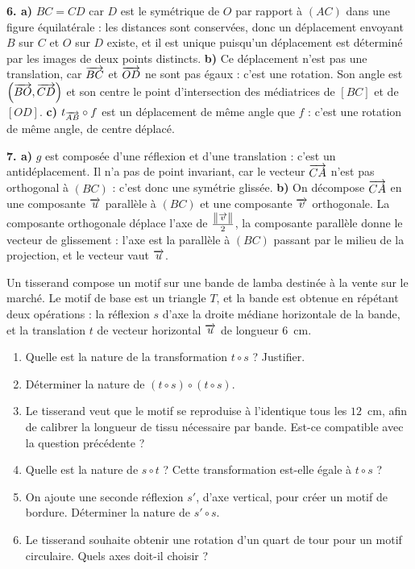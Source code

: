 \begin{corrige}[annales]
\textbf{6. a)} $BC = CD$ car $D$ est le symétrique de $O$ par rapport à
$(AC)$ dans une figure équilatérale : les distances sont conservées, donc un
déplacement envoyant $B$ sur $C$ et $O$ sur $D$ existe, et il est unique
puisqu'un déplacement est déterminé par les images de deux points distincts.
\textbf{b)} Ce déplacement n'est pas une translation, car $\overrightarrow{BC}$ et
$\overrightarrow{OD}$ ne sont pas égaux : c'est une rotation. Son angle est
$\left(\overrightarrow{BO},\overrightarrow{CD}\right)$ et son centre le point d'intersection des
médiatrices de $[BC]$ et de $[OD]$.
\textbf{c)} $t_{\overrightarrow{AB}} \circ f$ est un déplacement de même angle que $f$ :
c'est une rotation de même angle, de centre déplacé.

\textbf{7. a)} $g$ est composée d'une réflexion et d'une translation :
c'est un antidéplacement. Il n'a pas de point invariant, car le vecteur
$\overrightarrow{CA}$ n'est pas orthogonal à $(BC)$ : c'est donc une symétrie glissée.
\textbf{b)} On décompose $\overrightarrow{CA}$ en une composante $\overrightarrow{u}$ parallèle à
$(BC)$ et une composante $\overrightarrow{v}$ orthogonale. La composante orthogonale
déplace l'axe de $\frac{\left\lVert \overrightarrow{v} \right\rVert}{2}$, la composante parallèle donne le
vecteur de glissement : l'axe est la parallèle à $(BC)$ passant par le milieu
de la projection, et le vecteur vaut $\overrightarrow{u}$.
\end{corrige}

\begin{jecherche}
Un tisserand compose un motif sur une bande de lamba destinée à la vente sur
le marché. Le motif de base est un triangle $T$, et la bande est obtenue en
répétant deux opérations : la réflexion $s$ d'axe la droite médiane
horizontale de la bande, et la translation $t$ de vecteur horizontal $\overrightarrow{u}$
de longueur $6$~cm.

\begin{enumerate}[label=\textbf{\arabic*.}, leftmargin=*, itemsep=0.3em]
  \item Quelle est la nature de la transformation $t \circ s$ ? Justifier.
  \item Déterminer la nature de $(t \circ s) \circ (t \circ s)$.
  \item Le tisserand veut que le motif se reproduise à l'identique tous les
        $12$~cm, afin de calibrer la longueur de tissu nécessaire par bande.
        Est-ce compatible avec la question précédente ?
  \item Quelle est la nature de $s \circ t$ ? Cette transformation est-elle
        égale à $t \circ s$ ?
  \item On ajoute une seconde réflexion $s'$, d'axe vertical, pour créer un
        motif de bordure. Déterminer la nature de $s' \circ s$.
  \item Le tisserand souhaite obtenir une rotation d'un quart de tour pour un
        motif circulaire. Quels axes doit-il choisir ?
\end{enumerate}
\end{jecherche}

